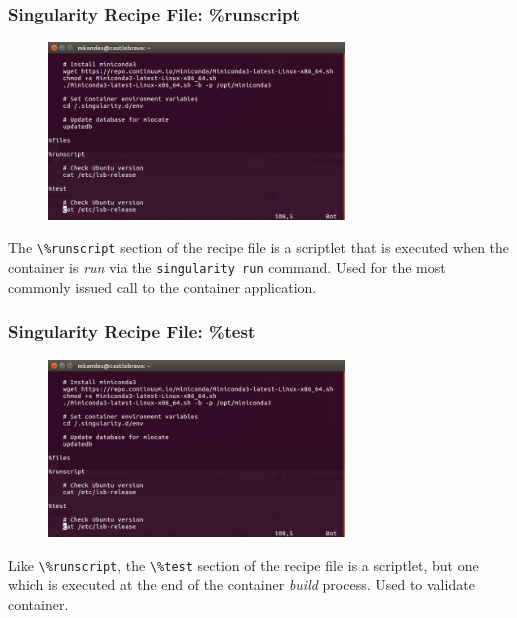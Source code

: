 \documentclass{beamer}
\begin{document}
\begin{frame}
   \frametitle{Singularity Recipe File: \%runscript}
   \begin{figure}[htbp]
      \includegraphics[width=0.7\textwidth]{images/singularity-definition-file-run-test.png}
   \end{figure}
   The \lstinline{\%runscript} section of the recipe file is a
   scriptlet that is executed when the container is \textit{run} via the
   \lstinline{singularity run} command. Used for the most commonly
   issued call to the container application.
\end{frame}

\begin{frame}
   \frametitle{Singularity Recipe File: \%test}
   \begin{figure}[htbp]
      \includegraphics[width=0.7\textwidth]{images/singularity-definition-file-run-test.png}
   \end{figure}
   Like \lstinline{\%runscript}, the \lstinline{\%test} section of the
   recipe file is a scriptlet, but one which is executed at the end of the
   container \textit{build} process. Used to validate container.
\end{frame}
\end{document}
